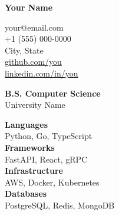 \documentclass[a4paper]{article}
\begin{document}
\noindent
\begin{minipage}[t]{0.34\textwidth}
\raggedright
\vspace{14pt}
\hspace{8pt}
{\Large \textbf{\color{primary} Your Name}}

\vspace{6pt}
\hspace{8pt}
{\small \color{gray}
\hspace{8pt}your@email.com \\
\hspace{8pt}+1 (555) 000-0000 \\
\hspace{8pt}City, State \\
\hspace{8pt}\href{https://github.com/you}{github.com/you} \\
\hspace{8pt}\href{https://linkedin.com/in/you}{linkedin.com/in/you}
}

\vspace{16pt}
\noindent\hspace{8pt}{\footnotesize \color{headingbg}\rule{0.85\textwidth}{0.4pt}}

\vspace{6pt}

\vspace{4pt}
\hspace{8pt}
{\small
\textbf{B.S. Computer Science} \\
\hspace{8pt}University Name \\
}

\vspace{14pt}
\noindent\hspace{8pt}{\footnotesize \color{headingbg}\rule{0.85\textwidth}{0.4pt}}

\vspace{6pt}

\vspace{4pt}
\hspace{8pt}
{\footnotesize
\textbf{Languages} \\
\hspace{4pt}Python, Go, TypeScript \\[3pt]
\textbf{Frameworks} \\
\hspace{4pt}FastAPI, React, gRPC \\[3pt]
\textbf{Infrastructure} \\
\hspace{4pt}AWS, Docker, Kubernetes \\[3pt]
\textbf{Databases} \\
\hspace{4pt}PostgreSQL, Redis, MongoDB
}


\end{minipage}
\end{document}
